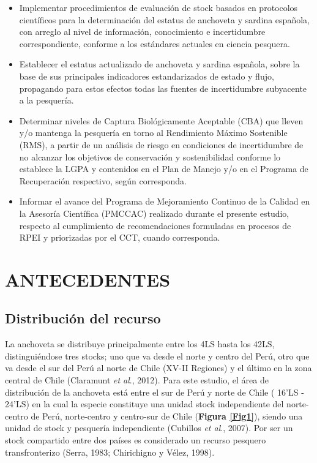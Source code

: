 \documentclass[letter,11pt]{article}
\begin{document}
\begin{itemize}
\def\labelenumi{\arabic{enumi}.}
\item
  Implementar procedimientos de evaluaci\'on de stock basados en
  protocolos cient\'ificos para la determinaci\'on del estatus de anchoveta
  y sardina espa\~{n}ola, con arreglo al nivel de informaci\'on, conocimiento
  e incertidumbre correspondiente, conforme a los est\'andares actuales en
  ciencia pesquera.
\item
  Establecer el estatus actualizado de anchoveta y sardina espa\~{n}ola,
  sobre la base de sus principales indicadores estandarizados de estado
  y flujo, propagando para estos efectos todas las fuentes de
  incertidumbre subyacente a la pesquer\'ia.
\item
  Determinar niveles de Captura Biol\'ogicamente Aceptable (CBA) que
  lleven y/o mantenga la pesquer\'ia en torno al Rendimiento M\'aximo
  Sostenible (RMS), a partir de un an\'alisis de riesgo en condiciones de
  incertidumbre de no alcanzar los objetivos de conservaci\'on y
  sostenibilidad conforme lo establece la LGPA y contenidos en el Plan
  de Manejo y/o en el Programa de Recuperaci\'on respectivo, seg\'un
  corresponda.
\item
  Informar el avance del Programa de Mejoramiento Continuo de la Calidad
  en la Asesor\'ia Cient\'ifica (PMCCAC) realizado durante el presente
  estudio, respecto al cumplimiento de recomendaciones formuladas en
  procesos de RPEI y priorizadas por el CCT, cuando corresponda.
\end{itemize}


\clearpage
\pagebreak

\section{ANTECEDENTES}

\subsection{Distribuci\'on del recurso}

La anchoveta se distribuye principalmente entre los 4\degree LS hasta
los 42\degree LS, distingui\'endose tres stocks; uno que va desde el norte
y centro del Per\'u, otro que va desde el sur del Per\'u al norte de Chile
(XV-II Regiones) y el \'ultimo en la zona central de Chile (Claramunt
\textit{et al}., 2012). Para este estudio, el \'area de distribuci\'on de la
anchoveta est\'a entre el sur de Per\'u y norte de Chile ( 16'LS -
24'LS) en la cual la especie constituye una unidad stock
independiente del norte-centro de Per\'u, norte-centro y centro-sur de
Chile (\textbf{Figura \ref{Fig1}}), siendo una unidad de stock y
pesquer\'ia independiente (Cubillos \textit{et al}., 2007). Por ser un
stock compartido entre dos pa\'ises es considerado un recurso pesquero
transfronterizo (Serra, 1983; Chirichigno y V\'elez, 1998).
\end{document}
